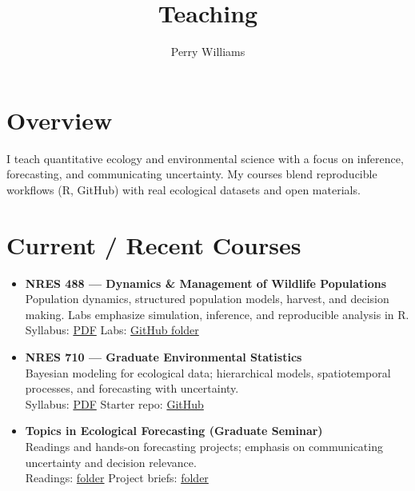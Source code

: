 \title{Teaching}
\author{Perry Williams}
\date{}

\maketitle

\section*{Overview}
I teach quantitative ecology and environmental science with a focus on inference, forecasting, and communicating uncertainty. My courses blend reproducible workflows (R, GitHub) with real ecological datasets and open materials.

\section*{Current / Recent Courses}
\begin{itemize}
  \item \textbf{NRES 488 — Dynamics \& Management of Wildlife Populations}\\
  Population dynamics, structured population models, harvest, and decision making. Labs emphasize simulation, inference, and reproducible analysis in R.\\
  Syllabus: \href{assets/syllabi/NRES488_Syllabus.pdf}{PDF} \quad Labs: \href{assets/labs/NRES488/}{GitHub folder}
  \vspace{0.5em}

  \item \textbf{NRES 710 — Graduate Environmental Statistics}\\
  Bayesian modeling for ecological data; hierarchical models, spatiotemporal processes, and forecasting with uncertainty.\\
  Syllabus: \href{assets/syllabi/NRES710_Syllabus.pdf}{PDF} \quad Starter repo: \href{https://github.com/perrywilliamsunr/nres710-starters}{GitHub}
  \vspace{0.5em}

  \item \textbf{Topics in Ecological Forecasting (Graduate Seminar)}\\
  Readings and hands-on forecasting projects; emphasis on communicating uncertainty and decision relevance.\\
  Readings: \href{assets/readings/forecasting/}{folder} \quad Project briefs: \href{assets/projects/forecasting/}{folder}
\end{itemize}

